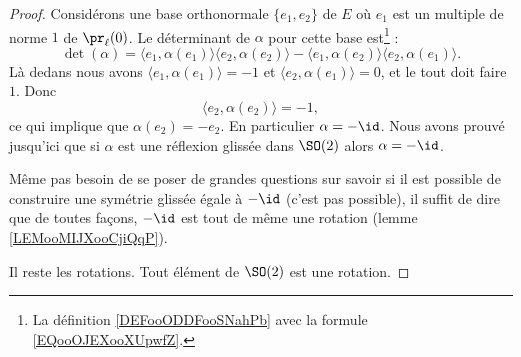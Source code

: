 \begin{proof}
    Considérons une base orthonormale \( \{ e_1,e_2 \}\) de \( E\) où \(e_1 \) est un multiple de norme \( 1\) de \( \pr_{\ell}(0)\). Le déterminant de \( \alpha\) pour cette base est\footnote{La définition \ref{DEFooODDFooSNahPb} avec la formule \eqref{EQooOJEXooXUpwfZ}.} :
    \begin{equation}
        \det(\alpha)=\langle e_1, \alpha(e_1)\rangle \langle e_2, \alpha(e_2)\rangle -\langle e_1, \alpha(e_2)\rangle \langle e_2, \alpha(e_1)\rangle.
    \end{equation}
    Là dedans nous avons \( \langle e_1, \alpha(e_1)\rangle =-1\) et \( \langle e_2, \alpha(e_1)\rangle =0\), et le tout doit faire \( 1\). Donc
    \begin{equation}
        \langle e_2, \alpha(e_2)\rangle =-1,
    \end{equation}
    ce qui implique que \( \alpha(e_2)=-e_2\). En particulier \( \alpha=-\id\). Nous avons prouvé jusqu'ici que si \( \alpha\) est une réflexion glissée dans \( \SO(2)\) alors \( \alpha=-\id\). 

    Même pas besoin de se poser de grandes questions sur savoir si il est possible de construire une symétrie glissée égale à \( -\id\) (c'est pas possible), il suffit de dire que de toutes façons, \( -\id\) est tout de même une rotation (lemme \ref{LEMooMIJXooCjiQqP}).
    
    Il reste les rotations. Tout élément de \( \SO(2)\) est une rotation.
\end{proof}
